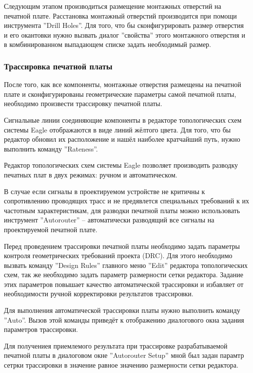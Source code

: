 Следующим этапом производиться размещение монтажных отверстий на печатной плате.
Расстановка монтажный отверстий производится при помощи инструмента ''Drill Holes''. Для того,
что бы сконфигурировать размер отверстия и его окантовки  нужно вызвать диалог ''свойства''
этого монтажного отверстия и в комбинированном выпадающем списке задать необходимый размер.

\subsubsection{Трассировка печатной платы}
После того, как все компоненты, монтажные отверстия размещены на печатной плате и
сконфигурированы геометрические параметры самой печатной платы, необходимо произвести
трассировку печатной платы.

Сигнальные линии соединяющие компоненты в редакторе  топологических схем системы Eagle
отображаются в виде линий жёлтого цвета. Для того, что бы редактор обновил их расположение
и нашёл наиболее кратчайший путь, нужно  выполнить команду ''Rateness''.

Редактор топологических схем системы Eagle позволяет производить разводку печатных плат в
двух режимах: ручном и автоматическом.

В случае если сигналы в проектируемом устройстве не критичны к сопротивлению проводящих
трасс и не предявлется специальных требований к их частотным характеристикам, для разводки
печатной платы можно использовать инструмент ''Autorouter''  -- автоматически разводящий все
сигналы на проектируемой печатной плате.

Перед проведением трассировки печатной платы необходимо задать параметры контроля
геометрических требований проекта (DRC). Для этого необходимо вызвать команду ''Design Rules''
главного меню ''Edit'' редактора топологических схем, так же необходимо задать параметр
размерности сетки редактора. Задание этих параметров повышает качество автоматической
трассировки и избавляет от необходимости ручной корректировки результатов трассировки.

Для выполнения автоматической трассировки платы нужно выполнить команду ''Auto''. Вызов
этой команды приведёт к отображению диалогового окна задания параметров трассировки.

Для получениея приемлемого результата при трассировке разрабатываемой печатной платы
в диалоговом окне ''Autorouter Setup'' мной был задан парамтр сетрки трассировки в значение
равное значению размерности сетки редактора.

